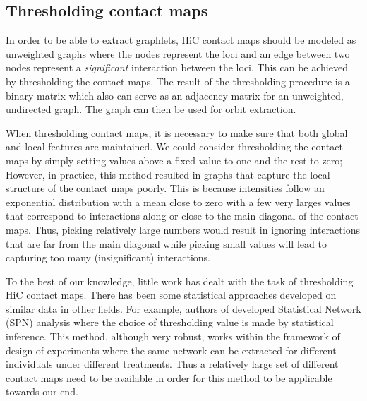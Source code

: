 \documentclass[]{article}
\begin{document}
\subsection{Thresholding contact maps}
In order to be able to extract graphlets, HiC contact maps should be modeled as
unweighted graphs where the nodes represent the loci and an edge between two 
nodes represent a \textit{significant} interaction between the loci.
This can be achieved by thresholding the contact maps. The result
of the thresholding procedure is a binary matrix which also can serve as
an adjacency matrix for an unweighted, undirected graph. The graph can then be
used for orbit extraction.

When thresholding contact maps, it is necessary to
make sure that both global and local features are
maintained. We could consider thresholding the
contact maps by simply setting values above a
fixed value to one and the rest to zero; However,
in practice, this method resulted in graphs that
capture the local structure of the contact maps
poorly. This is because intensities follow an
exponential distribution with a mean close to
zero with a few very larges values that correspond to
interactions along or close to the main diagonal of
the contact maps.  Thus, picking relatively large
numbers would result in ignoring interactions that
are far from the main diagonal while picking small
values will lead to capturing too many (insignificant)
interactions.

To the best of our knowledge, little work has
dealt with the task of thresholding HiC contact maps.
There has been some statistical approaches developed
on similar data in other fields.  For example,
authors of \cite{ginestet2011statistical} developed
Statistical Network (SPN) analysis where the
choice of thresholding value is made by statistical inference.
This method, although very robust, works within
the framework of design of experiments where the
same network can be extracted for different individuals
under different treatments. Thus a relatively large
set of different contact maps need to be available
in order for this method to be applicable towards
our end.
\end{document}

